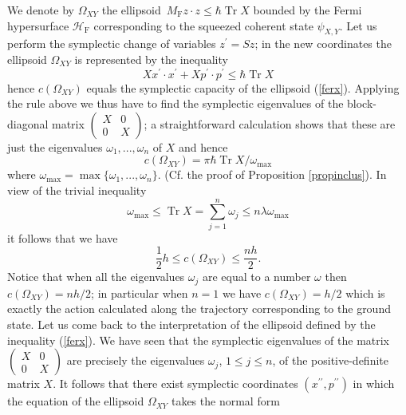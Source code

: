 \documentclass[11pt]{article}%
\begin{document}
We denote by $\Omega_{XY}$ the ellipsoid\ $M_{\mathrm{F}}z\cdot z\leq
\hbar\operatorname*{Tr}X$ bounded by the Fermi hypersurface $\mathcal{H}%
_{\mathrm{F}}$ corresponding to the squeezed coherent state $\psi_{X,Y}$. Let
us perform the symplectic change of variables $z^{\prime}=Sz$; in the new
coordinates the ellipsoid $\Omega_{XY}$ is represented by the inequality
\begin{equation}
Xx^{\prime}\cdot x^{\prime}+Xp^{\prime}\cdot p^{\prime}\leq\hbar
\operatorname*{Tr}X \label{ferx}%
\end{equation}
hence $c(\Omega_{XY})$ equals the symplectic capacity of the ellipsoid
(\ref{ferx}). Applying the rule above we thus have to find the symplectic
eigenvalues of the block-diagonal matrix $%
\begin{pmatrix}
X & 0\\
0 & X
\end{pmatrix}
$; a straightforward calculation shows that these are just the eigenvalues
$\omega_{1},...,\omega_{n}$ of $X$ and hence%
\begin{equation}
c(\Omega_{XY})=\pi\hbar\operatorname*{Tr}X/\omega_{\max} \label{cwf}%
\end{equation}
where $\omega_{\max}=\max\{\omega_{1},...,\omega_{n}\}$. (Cf. the proof of
Proposition \ref{propinclus}). In view of the trivial inequality
\begin{equation}
\omega_{\max}\leq\operatorname*{Tr}X=\sum_{j=1}^{n}\omega_{j}\leq
n\lambda\omega_{\max} \label{maxnmax}%
\end{equation}
it follows that we have
\begin{equation}
\frac{1}{2}h\leq c(\Omega_{XY})\leq\frac{nh}{2}. \label{nh}%
\end{equation}
Notice that when all the eigenvalues $\omega_{j}$ are equal to a number
$\omega$ then $c(\Omega_{XY})=nh/2$; in particular when $n=1$ we have
$c(\Omega_{XY})=h/2$ which is exactly the action calculated along the
trajectory corresponding to the ground state. Let us come back to the
interpretation of the ellipsoid defined by the inequality (\ref{ferx}). We
have seen that the symplectic eigenvalues of the matrix $%
\begin{pmatrix}
X & 0\\
0 & X
\end{pmatrix}
$ are precisely the eigenvalues $\omega_{j}$, $1\leq j\leq n$, of the
positive-definite matrix $X$. It follows that there exist symplectic
coordinates $(x^{\prime\prime},p^{\prime\prime})$ in which the equation of the
ellipsoid $\Omega_{XY}$ takes the normal form%
\end{document}
